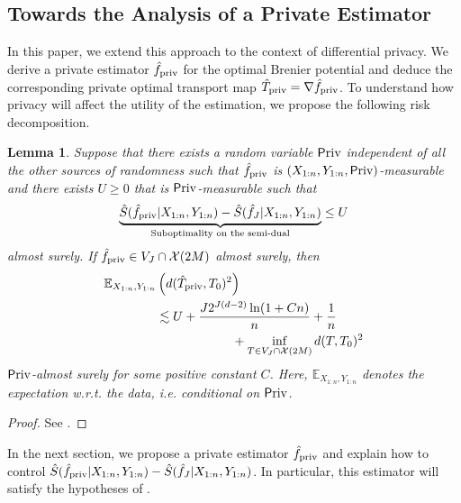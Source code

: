 \documentclass{article}
\theoremstyle{plain}
\newtheorem{lemma}[theorem]{Lemma}
\theoremstyle{definition}
\theoremstyle{remark}
\newcommand{\E}[0]{\mathbb{E}}
\newcommand\p[1]{\left( {#1}\right)}
\begin{document}
 


\subsection{Towards the Analysis of a Private Estimator}

In this paper, we extend this approach to the context of differential privacy. We derive a private estimator $\hat{f}_{\text{\normalshape priv}}$ for the optimal Brenier potential and deduce the corresponding private optimal transport map $\hat{T}_{\text{\normalshape priv}} = \nabla \hat{f}_{\text{\normalshape priv}}$.
To understand how privacy will affect the utility of the estimation, we propose the following risk decomposition.

\newcommand{\Priv}{\mathsf{P}\text{\normalshape riv}}

\begin{lemma}
\label{lemma:risk_decomposition}
Suppose that there exists a random variable $\Priv $ independent of all the other sources of randomness such that $\hat{f}_{\text{\normalshape priv}}$ is $( X_{1:n}, Y_{1:n}, \Priv )$-measurable
and there exists $U \geq 0$ that is $\Priv $-measurable such that 
\begin{equation}
    \underbrace{\hat{S}(\hat{f}_{\text{\normalshape priv}} | X_{1:n}, Y_{1:n}) - \hat{S}(\hat{f}_{J} | X_{1:n}, Y_{1:n})}_{\text{Suboptimality on the semi-dual}} \leq U
\end{equation}
almost surely. If $\hat{f}_{\text{\normalshape priv}} \in V_J \cap \mathcal{X}(2M)$ almost surely, then 
    \begin{equation}
    \begin{aligned}
        \E_{X_{1:n}, Y_{1:n}} &\p{d(\hat{T}_{\text{\normalshape priv}}, T_0)^2} \\
        &\lesssim 
        U + \frac{J 2^{J (d-2)}\ln(1 + C n)}{n}+ \frac{1}{n} \\
        &\qquad\qquad\qquad + \inf_{T \in V_J \cap \mathcal{X}(2M)} d(T, T_0)^2
    \end{aligned}
    \end{equation}
    $\Priv $-almost surely for some positive constant $C$. 
    Here, $\E_{X_{1:n}, Y_{1:n}}$ denotes the expectation w.r.t. the data, i.e. conditional on $\Priv $.
\end{lemma}
\begin{proof}
    See .
\end{proof}

In the next section, we propose a private estimator $\hat{f}_{\text{\normalshape priv}}$ and explain how to control $\hat{S}(\hat{f}_{\text{\normalshape priv}} | X_{1:n}, Y_{1:n}) - \hat{S}(\hat{f}_{J} | X_{1:n}, Y_{1:n})$. In particular, this estimator will satisfy the hypotheses of .
\end{document}

